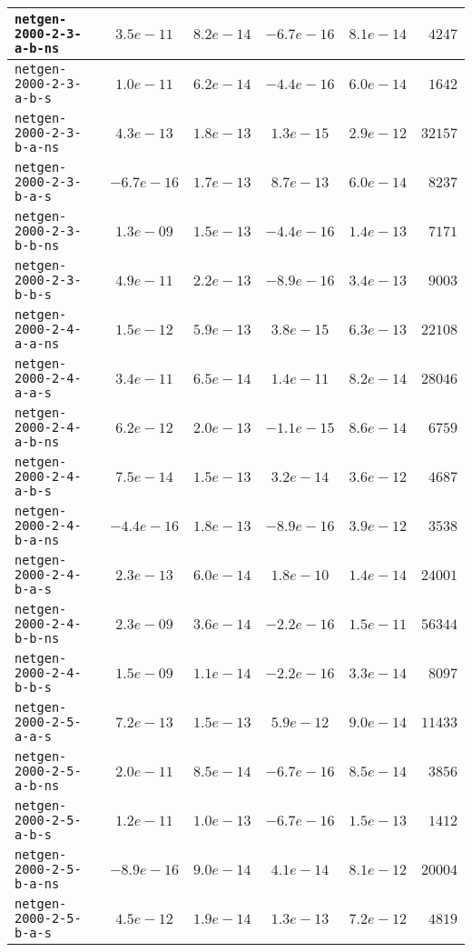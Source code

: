 \begin{center}
\begin{longtable}{|l || c | c | c | c | r|}
\hline
\texttt{netgen-2000-2-3-a-b-ns} & $3.5e-11$ & $8.2e-14$ & $-6.7e-16$ & $8.1e-14$ & $4247$ \\
\hline
\texttt{netgen-2000-2-3-a-b-s} & $1.0e-11$ & $6.2e-14$ & $-4.4e-16$ & $6.0e-14$ & $1642$ \\
\hline
\texttt{netgen-2000-2-3-b-a-ns} & $4.3e-13$ & $1.8e-13$ & $1.3e-15$ & $2.9e-12$ & $32157$ \\
\hline
\texttt{netgen-2000-2-3-b-a-s} & $-6.7e-16$ & $1.7e-13$ & $8.7e-13$ & $6.0e-14$ & $8237$ \\
\hline
\texttt{netgen-2000-2-3-b-b-ns} & $1.3e-09$ & $1.5e-13$ & $-4.4e-16$ & $1.4e-13$ & $7171$ \\
\hline
\texttt{netgen-2000-2-3-b-b-s} & $4.9e-11$ & $2.2e-13$ & $-8.9e-16$ & $3.4e-13$ & $9003$ \\
\hline
\texttt{netgen-2000-2-4-a-a-ns} & $1.5e-12$ & $5.9e-13$ & $3.8e-15$ & $6.3e-13$ & $22108$ \\
\hline
\texttt{netgen-2000-2-4-a-a-s} & $3.4e-11$ & $6.5e-14$ & $1.4e-11$ & $8.2e-14$ & $28046$ \\
\hline
\texttt{netgen-2000-2-4-a-b-ns} & $6.2e-12$ & $2.0e-13$ & $-1.1e-15$ & $8.6e-14$ & $6759$ \\
\hline
\texttt{netgen-2000-2-4-a-b-s} & $7.5e-14$ & $1.5e-13$ & $3.2e-14$ & $3.6e-12$ & $4687$ \\
\hline
\texttt{netgen-2000-2-4-b-a-ns} & $-4.4e-16$ & $1.8e-13$ & $-8.9e-16$ & $3.9e-12$ & $3538$ \\
\hline
\texttt{netgen-2000-2-4-b-a-s} & $2.3e-13$ & $6.0e-14$ & $1.8e-10$ & $1.4e-14$ & $24001$ \\
\hline
\texttt{netgen-2000-2-4-b-b-ns} & $2.3e-09$ & $3.6e-14$ & $-2.2e-16$ & $1.5e-11$ & $56344$ \\
\hline
\texttt{netgen-2000-2-4-b-b-s} & $1.5e-09$ & $1.1e-14$ & $-2.2e-16$ & $3.3e-14$ & $8097$ \\
\hline
\texttt{netgen-2000-2-5-a-a-s} & $7.2e-13$ & $1.5e-13$ & $5.9e-12$ & $9.0e-14$ & $11433$ \\
\hline
\texttt{netgen-2000-2-5-a-b-ns} & $2.0e-11$ & $8.5e-14$ & $-6.7e-16$ & $8.5e-14$ & $3856$ \\
\hline
\texttt{netgen-2000-2-5-a-b-s} & $1.2e-11$ & $1.0e-13$ & $-6.7e-16$ & $1.5e-13$ & $1412$ \\
\hline
\texttt{netgen-2000-2-5-b-a-ns} & $-8.9e-16$ & $9.0e-14$ & $4.1e-14$ & $8.1e-12$ & $20004$ \\
\hline
\texttt{netgen-2000-2-5-b-a-s} & $4.5e-12$ & $1.9e-14$ & $1.3e-13$ & $7.2e-12$ & $4819$ \\

\end{longtable}
\end{center}
